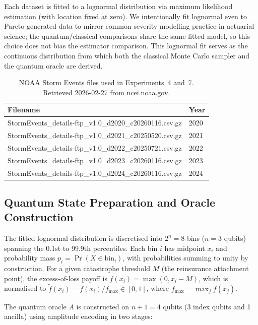 \documentclass[11pt,a4paper]{article}
\begin{document}
Each dataset is fitted to a lognormal distribution via maximum likelihood estimation (with location fixed at zero). We intentionally fit lognormal even to Pareto-generated data to mirror common severity-modelling practice in actuarial science; the quantum/classical comparisons share the same fitted model, so this choice does not bias the estimator comparison. This lognormal fit serves as the continuous distribution from which both the classical Monte Carlo sampler and the quantum oracle are derived.

\begin{table}[t]
\centering
\caption{NOAA Storm Events files used in Experiments~4 and~7. Retrieved 2026-02-27 from ncei.noaa.gov.}
\label{tab:noaa_files}
\begin{tabular}{ll}
\toprule
Filename & Year \\
\midrule
StormEvents\_details-ftp\_v1.0\_d2020\_c20260116.csv.gz & 2020 \\
StormEvents\_details-ftp\_v1.0\_d2021\_c20250520.csv.gz & 2021 \\
StormEvents\_details-ftp\_v1.0\_d2022\_c20250721.csv.gz & 2022 \\
StormEvents\_details-ftp\_v1.0\_d2023\_c20260116.csv.gz & 2023 \\
StormEvents\_details-ftp\_v1.0\_d2024\_c20260116.csv.gz & 2024 \\
\bottomrule
\end{tabular}
\end{table}

\subsection{Quantum State Preparation and Oracle Construction}

The fitted lognormal distribution is discretised into $2^n = 8$ bins ($n = 3$ qubits) spanning the 0.1st to 99.9th percentiles. Each bin $i$ has midpoint $x_i$ and probability mass $p_i = \Pr(X \in \text{bin}_i)$, with probabilities summing to unity by construction. For a given catastrophe threshold $M$ (the reinsurance attachment point), the excess-of-loss payoff is $f(x_i) = \max(0, x_i - M)$, which is normalised to $\tilde{f}(x_i) = f(x_i)/f_{\max} \in [0,1]$, where $f_{\max} = \max_j f(x_j)$.

The quantum oracle $A$ is constructed on $n+1 = 4$ qubits (3 index qubits and 1 ancilla) using amplitude encoding in two stages:
\end{document}
